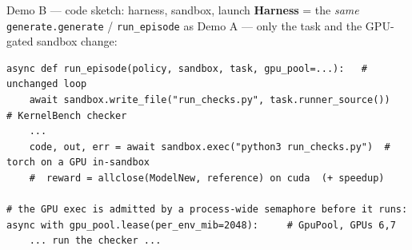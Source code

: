 \documentclass[aspectratio=169]{beamer}
\begin{document}
\begin{frame}[fragile]{Demo B --- code sketch: harness, sandbox, launch}
  \footnotesize\textbf{Harness} = the \emph{same} \texttt{generate.generate} / \texttt{run\_episode} as Demo A
  --- only the task and the GPU-gated sandbox change:
\begin{lstlisting}[basicstyle=\ttfamily\scriptsize]
async def run_episode(policy, sandbox, task, gpu_pool=...):   # unchanged loop
    await sandbox.write_file("run_checks.py", task.runner_source())   # KernelBench checker
    ...
    code, out, err = await sandbox.exec("python3 run_checks.py")  # torch on a GPU in-sandbox
    #  reward = allclose(ModelNew, reference) on cuda  (+ speedup)

# the GPU exec is admitted by a process-wide semaphore before it runs:
async with gpu_pool.lease(per_env_mib=2048):     # GpuPool, GPUs 6,7
    ... run the checker ...
\end{lstlisting}
\end{frame}
\end{document}
